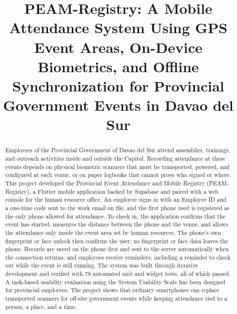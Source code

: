 \documentclass[conference]{IEEEtran}
\begin{document}

\title{PEAM-Registry: A Mobile Attendance System Using GPS Event Areas,
On-Device Biometrics, and Offline Synchronization for Provincial
Government Events in Davao del Sur}

\author{
\and
{}
}

\maketitle


\begin{abstract}
Employees of the Provincial Government of Davao del Sur attend
assemblies, trainings, and outreach activities inside and outside the
Capitol. Recording attendance at these events depends on physical
biometric scanners that must be transported, powered, and configured at
each venue, or on paper logbooks that cannot prove who signed or where.
This project developed the Provincial Event Attendance and Mobile
Registry (PEAM-Registry), a Flutter mobile application backed by
Supabase and paired with a web console for the human resource office.
An employee signs in with an Employee ID and a one-time code sent to the
work email on file, and the first phone used is registered as the only
phone allowed for attendance. To check in, the application confirms that
the event has started, measures the distance between the phone and the
venue, and allows the attendance only inside the event area set by human
resources. The phone's own fingerprint or face unlock then confirms the
user; no fingerprint or face data leaves the phone. Records are saved on
the phone first and sent to the server automatically when the connection
returns, and employees receive reminders, including a reminder to check
out while the event is still running. The system was built through
iterative development and verified with 78 automated unit and widget
tests, all of which passed. A task-based usability evaluation using the
System Usability Scale has been designed for provincial employees. The
project shows that ordinary smartphones can replace transported scanners
for off-site government events while keeping attendance tied to a
person, a place, and a time.
\end{abstract}
\end{document}
